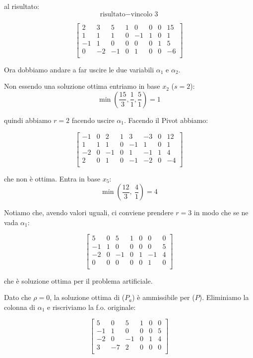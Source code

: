al risultato:
$$\text{risultato} - \text{vincolo 3}$$

$$
\left[ {\begin{array}{cccccccc}
	2 & 3 & 5 & 1 & 0 & 0 & 0 & 15\\
	1 & 1 & 1 & 0 & -1 & 1 & 0 & 1\\
	-1 & 1 & 0 & 0 & 0 & 0 & 1 & 5\\
	0 & -2 & -1 & 0 & 1 & 0 & 0 & -6\\
\end{array} } \right]
$$

Ora dobbiamo andare a far uscire le due variabili $\alpha_1$ e $\alpha_2$.

Non essendo una soluzione ottima entriamo in base $x_2$ ($s = 2$):
$$\min (\frac{15}{3}, \frac{1}{1}, \frac{5}{1}) = 1$$

quindi abbiamo $r = 2$ facendo uscire $\alpha_1$. Facendo il Pivot abbiamo:

$$
\left[ {\begin{array}{cccccccc}
	-1 & 0 & 2 & 1 & 3 & -3 & 0 & 12\\
	1 & 1 & 1 & 0 & -1 & 1 & 0 & 1\\
	-2 & 0 & -1 & 0 & 1 & -1 & 1 & 4\\
	2 & 0 & 1 & 0 & -1 & -2 & 0 & -4\\
\end{array} } \right]
$$

che non è ottima. Entra in base $x_5$:
$$\min (\frac{12}{3},\ \frac{4}{1}) = 4$$

Notiamo che, avendo valori uguali, ci conviene prendere $r = 3$ in modo che se ne vada $\alpha_1$:

$$
\left[ {\begin{array}{ccccccc}
	5 & 0 & 5 & 1 & 0 & 0 & 0\\
	-1 & 1 & 0 & 0 & 0 & 0 & 5\\
	-2 & 0 & -1 & 0 & 1 & -1 & 4\\
	0 & 0 & 0 & 0 & 0 & 1 & 0\\
\end{array} } \right]
$$

che è soluzione ottima per il problema artificiale.

Dato che $\rho = 0$, la soluzione ottima di ($P_a$) è ammissibile per ($P$). Eliminiamo la colonna di $\alpha_1$ e riscriviamo la f.o. originale:

$$
\left[ {\begin{array}{cccccc}
	5 & 0 & 5 & 1 & 0 & 0\\
	-1 & 1 & 0 & 0 & 0 & 5\\
	-2 & 0 & -1 & 0 & 1 & 4\\
	3 & -7 & 2 & 0 & 0 & 0\\
\end{array} } \right]
$$


